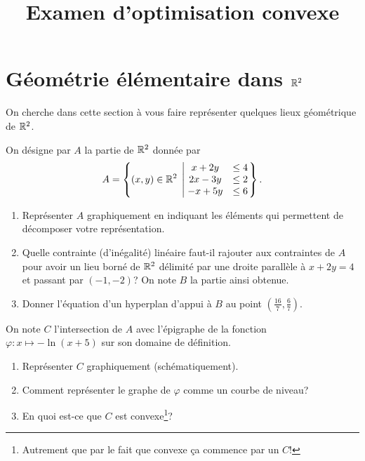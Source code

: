 \documentclass[11pt, a4paper]{article}
\title{%
  { \huge Examen d'optimisation convexe}%
}
\author{}
\date{}
\begin{document}
\maketitle\thispagestyle{fancy}

\section{Géométrie élémentaire dans $\mathbb{R}^2$}
\label{sec:geom}

\noindent On cherche dans cette section à vous faire représenter
quelques lieux géométrique de $\mathbb{R}^2$.

\noindent On désigne par $A$ la partie de $\mathbb{R}^2$ donnée par
\[
  A = \left\{ (x, y) \in \mathbb{R}^2 \; \left| \;
      \begin{matrix}
        x + 2y & \leq 4 \\
        2x - 3y & \leq 2 \\
        -x + 5y & \leq 6
    \end{matrix}\right.\right\}.
\]
\begin{question}{3}
  \begin{enumerate}
  \item
    Représenter $A$ graphiquement en indiquant les éléments qui
    permettent de décomposer votre représentation.
  \item Quelle contrainte (d'inégalité) linéaire faut-il rajouter aux
    contraintes de $A$ pour avoir un lieu borné de $\mathbb{R}^2$ délimité par
    une droite parallèle à $x + 2y = 4$ et passant par $(-1,-2)$? On
    note $B$ la partie ainsi obtenue.
  \item Donner l'équation d'un hyperplan d'appui à $B$ au point
    $(\frac{16}{7}, \frac{6}{7})$.
  \end{enumerate}
\end{question}
On note $C$ l'intersection de $A$ avec l'épigraphe de la fonction
$\varphi: x \mapsto -\ln(x+5)$ sur son domaine de définition.
\begin{question}{3}
  \begin{enumerate}
  \item Représenter $C$ graphiquement (schématiquement).
  \item Comment représenter le graphe de $\varphi$ comme un courbe de
    niveau?
  \item En quoi est-ce que $C$ est convexe\footnote{Autrement que par
      le fait que convexe \c{c}a commence par un $C$!}?
  \end{enumerate}
\end{question}
\end{document}
